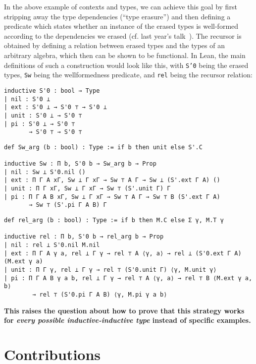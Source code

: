 \documentclass{easychair}
\begin{document}
In the above example of contexts and types, we can achieve this goal by
first stripping away the type dependencies (``type erasure'') and then defining
a predicate which states whether an instance of the erased types is well-formed
according to the dependencies we erased (cf. last year's talk~\cite{types2018}).
The recursor is obtained by defining a relation between erased types and the
types of an arbitrary algebra, which then can be shown to be functional.
In Lean, the main definitions of such a construction would look like this, with
\texttt{S'0} being the erased types, \texttt{Sw} being the wellformedness predicate,
and \texttt{rel} being the recursor relation:
\noindent
\begin{minipage}{.33\textwidth}
\begin{lstlisting}
inductive S'0 : bool → Type
| nil : S'0 ⊥
| ext : S'0 ⊥ → S'0 ⊤ → S'0 ⊥
| unit : S'0 ⊥ → S'0 ⊤
| pi : S'0 ⊥ → S'0 ⊤
       → S'0 ⊤ → S'0 ⊤
\end{lstlisting}
\end{minipage} \hfill
\begin{minipage}{.65\textwidth}
\begin{lstlisting}
def Sw_arg (b : bool) : Type := if b then unit else S'.C

inductive Sw : Π b, S'0 b → Sw_arg b → Prop
| nil : Sw ⊥ S'0.nil ()
| ext : Π Γ A xΓ, Sw ⊥ Γ xΓ → Sw ⊤ A Γ → Sw ⊥ (S'.ext Γ A) ()
| unit : Π Γ xΓ, Sw ⊥ Γ xΓ → Sw ⊤ (S'.unit Γ) Γ
| pi : Π Γ A B xΓ, Sw ⊥ Γ xΓ → Sw ⊤ A Γ → Sw ⊤ B (S'.ext Γ A)
       → Sw ⊤ (S'.pi Γ A B) Γ
\end{lstlisting}
\end{minipage}
\noindent\begin{minipage}{\textwidth}\begin{lstlisting}
def rel_arg (b : bool) : Type := if b then M.C else Σ γ, M.T γ

inductive rel : Π b, S'0 b → rel_arg b → Prop
| nil : rel ⊥ S'0.nil M.nil
| ext : Π Γ A γ a, rel ⊥ Γ γ → rel ⊤ A ⟨γ, a⟩ → rel ⊥ (S'0.ext Γ A) (M.ext γ a)
| unit : Π Γ γ, rel ⊥ Γ γ → rel ⊤ (S'0.unit Γ) ⟨γ, M.unit γ⟩
| pi : Π Γ A B γ a b, rel ⊥ Γ γ → rel ⊤ A ⟨γ, a⟩ → rel ⊤ B ⟨M.ext γ a, b⟩
        → rel ⊤ (S'0.pi Γ A B) ⟨γ, M.pi γ a b⟩
\end{lstlisting}
\end{minipage}
\textbf{This raises the question about how to prove that this strategy works for \emph{every
possible inductive-inductive type} instead of specific examples.}

\section{Contributions}
\end{document}
